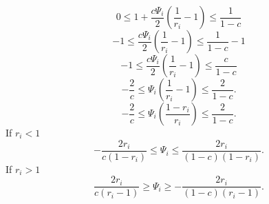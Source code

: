 \documentclass[../thesis.tex]{subfiles}
\begin{document}
\begin{equation}
    0
    \leq
    1
    + \frac{c\Psi_{i}}{2}\left(
        \frac{1}{r_i}
        - 1
    \right)
    \leq
    \frac{1}{1-c}
\end{equation}
\begin{equation}
    -1
    \leq
    \frac{c\Psi_{i}}{2}\left(
        \frac{1}{r_i}
        - 1
    \right)
    \leq
    \frac{1}{1-c} - 1
\end{equation}
\begin{equation}
    -1
    \leq
    \frac{c\Psi_{i}}{2}\left(
        \frac{1}{r_i}
        - 1
    \right)
    \leq
    \frac{c}{1-c}
\end{equation}
\begin{equation}
    -\frac{2}{c}
    \leq
    \Psi_{i}\left(
        \frac{1}{r_i}
        - 1
    \right)
    \leq
    \frac{2}{1-c}.
\end{equation}
\[
    -\frac{2}{c}
    \leq
    \Psi_{i}\left(
        \frac{1-r_i}{r_i}
        \right)
    \leq
    \frac{2}{1-c}.
\]
If \(r_i < 1\)
\[
    -\frac{2 r_i}{c\left( 1-r_i \right)}
    \leq
    \Psi_{i}
    \leq
    \frac{2 r_i}{\left( 1-c \right)\left( 1-r_i \right)}.
\]
If \(r_i > 1\)
\[
    \frac{2 r_i}{c\left( r_i - 1 \right)}
    \geq
    \Psi_{i}
    \geq
    -\frac{2 r_i}{\left( 1-c \right)\left( r_i - 1 \right)}.
\]
\end{document}
